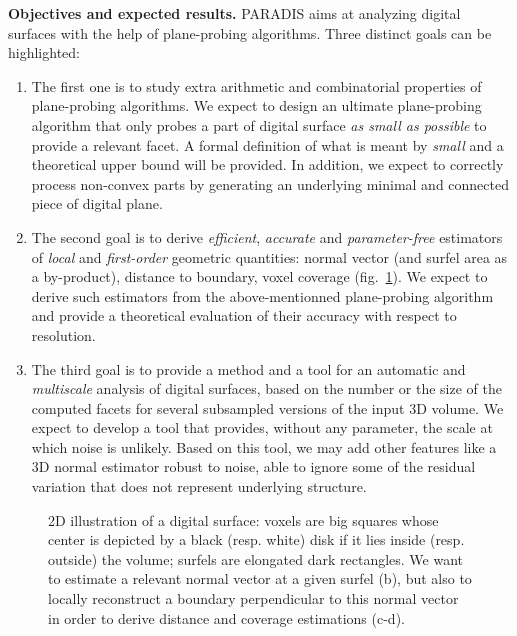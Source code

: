 \noindent\textbf{Objectives and expected results.}
PARADIS aims at analyzing digital surfaces with the help of plane-probing algorithms. 
Three distinct goals can be highlighted:
\begin{enumerate}[label=(G\arabic*)]
  \item %
The first one is to study extra arithmetic and combinatorial properties
of plane-probing algorithms. We expect to design an ultimate plane-probing algorithm that
only probes a part of digital surface \emph{as small as possible} to provide a relevant facet.
A formal definition of what is meant by \emph{small} and a theoretical upper bound will be provided.
In addition, we expect to correctly process non-convex parts by generating an underlying
minimal and connected piece of digital plane.  \label{goalppa} 
 \item %
The second goal is to derive \emph{efficient}, \emph{accurate} and \emph{parameter-free} estimators
of \emph{local} and \emph{first-order} geometric quantities: normal vector (and surfel area as a by-product),
distance to boundary, voxel coverage (fig.~\ref{fig:2D}). We expect to derive such estimators from
the above-mentionned plane-probing algorithm and provide a theoretical evaluation of their accuracy
with respect to resolution. \label{goalestim}  
 \item %
The third goal is to provide a method and a tool for an automatic and \emph{multiscale} analysis of digital surfaces,
based on the number or the size of the computed facets for several subsampled versions of the input 3D volume. 
We expect to develop a tool that provides, without any parameter, the scale at which noise is unlikely. Based on
this tool, we may add other features like a 3D normal estimator robust to noise, \ie able to ignore some of
the residual variation that does not represent underlying structure.  \label{goalscale}
\end{enumerate}

\begin{figure}[hbt]
  \centering
{} \hspace{0.05\textwidth}
 \hspace{0.05\textwidth}
 \hspace{0.05\textwidth}
 \caption{2D illustration of a digital surface: voxels are big squares whose center is depicted by a black (resp. white) disk if it lies inside (resp. outside) the volume; surfels are elongated dark rectangles. We want to estimate a relevant normal vector at a given surfel (b), but also to locally reconstruct a boundary perpendicular to this normal vector in order to derive distance and coverage estimations (c-d).} 
\label{fig:2D} 
\end{figure}

